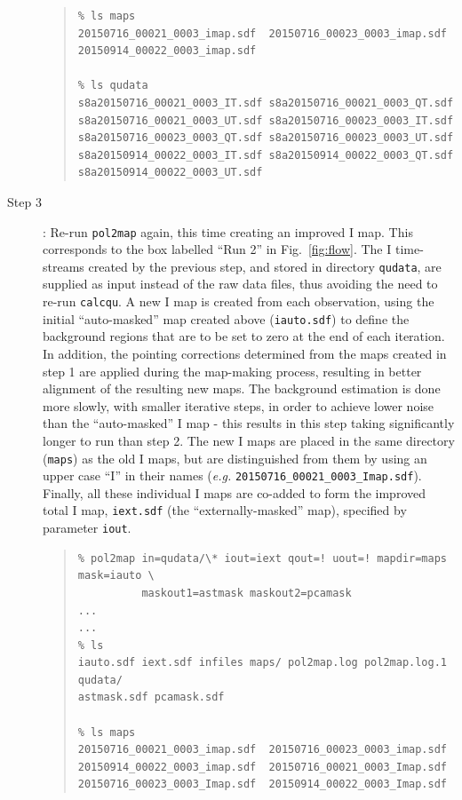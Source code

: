 \documentclass[twoside,11pt]{starlink}
\begin{document}
\begin{description}
\begin{quote}
\begin{verbatim}
% ls maps
20150716_00021_0003_imap.sdf  20150716_00023_0003_imap.sdf
20150914_00022_0003_imap.sdf

% ls qudata
s8a20150716_00021_0003_IT.sdf s8a20150716_00021_0003_QT.sdf
s8a20150716_00021_0003_UT.sdf s8a20150716_00023_0003_IT.sdf
s8a20150716_00023_0003_QT.sdf s8a20150716_00023_0003_UT.sdf
s8a20150914_00022_0003_IT.sdf s8a20150914_00022_0003_QT.sdf
s8a20150914_00022_0003_UT.sdf
\end{verbatim}
\end{quote}

\item[Step 3]:  Re-run \texttt{pol2map} again, this time creating an
improved I map. This corresponds to the box
labelled ``Run 2'' in Fig.~\ref{fig:flow}. The I time-streams created by the previous step, and stored
in directory \texttt{qudata}, are supplied as input instead of the raw data
files, thus avoiding the need to re-run \texttt{calcqu}. A new I map is
created from each observation, using the initial ``auto-masked'' map created
above (\texttt{iauto.sdf}) to define the background regions that are to be set
to zero at the end of each iteration. In addition, the pointing corrections
determined from the maps created in step 1 are applied during the map-making
process, resulting in better alignment of the resulting new maps. The
background estimation is done more slowly, with smaller iterative steps,
in order to achieve lower noise than the ``auto-masked'' I map - this
results in this step taking significantly longer to run than step 2. The new
I maps are placed in the same directory (\texttt{maps}) as the old I
maps, but are distinguished from them by using an upper case ``I'' in
their names (\emph{e.g.} \texttt{20150716\_00021\_0003\_Imap.sdf}). Finally,
all these individual I maps are co-added to form the improved total I map,
\texttt{iext.sdf} (the ``externally-masked'' map), specified by parameter
\texttt{iout}.

\begin{quote}
\begin{verbatim}
% pol2map in=qudata/\* iout=iext qout=! uout=! mapdir=maps mask=iauto \
          maskout1=astmask maskout2=pcamask
...
...
% ls
iauto.sdf iext.sdf infiles maps/ pol2map.log pol2map.log.1 qudata/
astmask.sdf pcamask.sdf

% ls maps
20150716_00021_0003_imap.sdf  20150716_00023_0003_imap.sdf
20150914_00022_0003_imap.sdf  20150716_00021_0003_Imap.sdf
20150716_00023_0003_Imap.sdf  20150914_00022_0003_Imap.sdf

\end{verbatim}
\end{quote}


\end{description}
\end{document}

